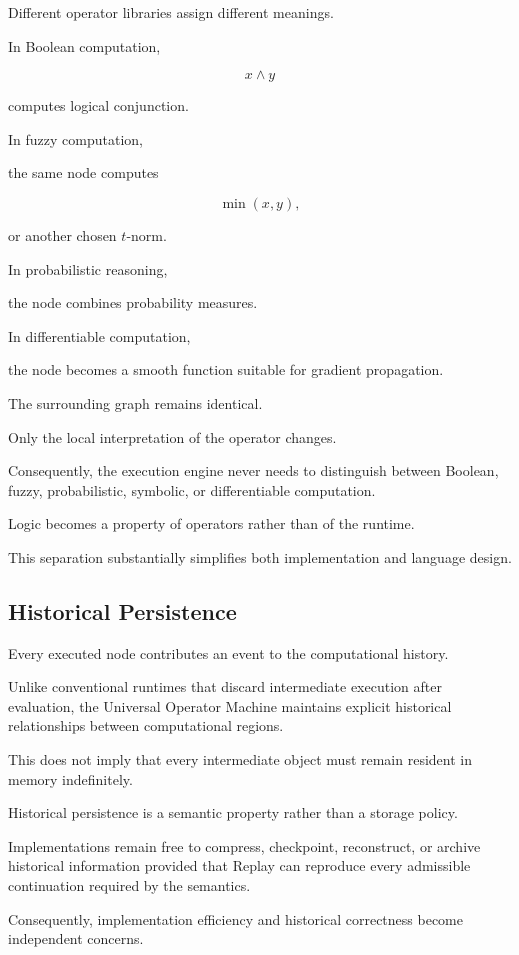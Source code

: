 \documentclass[12pt,oneside]{article}
\theoremstyle{definition}
\theoremstyle{remark}
\begin{document}
Different operator libraries assign different meanings.

In Boolean computation,

\[
x\land y
\]

computes logical conjunction.

In fuzzy computation,

the same node computes

\[
\min(x,y),
\]

or another chosen \(t\)-norm.

In probabilistic reasoning,

the node combines probability measures.

In differentiable computation,

the node becomes a smooth function suitable for gradient propagation.

The surrounding graph remains identical.

Only the local interpretation of the operator changes.

Consequently, the execution engine never needs to distinguish between Boolean,
fuzzy, probabilistic, symbolic, or differentiable computation.

Logic becomes a property of operators rather than of the runtime.

This separation substantially simplifies both implementation and language
design.

\subsection{Historical Persistence}

Every executed node contributes an event to the computational history.

Unlike conventional runtimes that discard intermediate execution after
evaluation, the Universal Operator Machine maintains explicit historical
relationships between computational regions.

This does not imply that every intermediate object must remain resident in
memory indefinitely.

Historical persistence is a semantic property rather than a storage policy.

Implementations remain free to compress, checkpoint, reconstruct, or archive
historical information provided that Replay can reproduce every admissible
continuation required by the semantics.

Consequently, implementation efficiency and historical correctness become
independent concerns.
\end{document}
